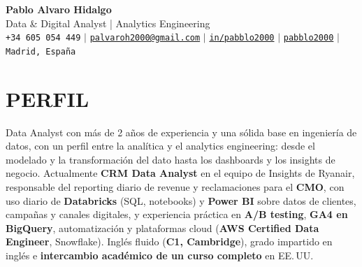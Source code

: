\documentclass[a4paper,11pt]{article}
\begin{document}
\begin{center}
    \textbf{\Huge Pablo Alvaro Hidalgo} \\ \vspace{3pt}
    \large Data \& Digital Analyst | Analytics Engineering \\ \vspace{4pt}
    \small
    \faPhone* \hspace{1pt}\texttt{+34 605 054 449} \hspace{2pt} $|$ \hspace{2pt}
    \faEnvelope \hspace{1pt}\href{mailto:palvaroh2000@gmail.com}{\texttt{palvaroh2000@gmail.com}} \hspace{2pt} $|$ \hspace{2pt}
    \faLinkedin \hspace{1pt}\href{https://www.linkedin.com/in/pabblo2000/}{\texttt{in/pabblo2000}} \hspace{2pt} $|$ \hspace{2pt}
    \faGithub \hspace{1pt}\href{https://github.com/pabblo2000}{\texttt{pabblo2000}} \hspace{2pt} $|$ \hspace{2pt}
    \faMapMarker* \hspace{1pt}\texttt{Madrid, España}
\end{center}
\vspace{-8pt}

\section{PERFIL}
\small{
Data Analyst con más de 2 años de experiencia y una sólida base en ingeniería de datos, con un perfil entre la analítica y el analytics engineering: desde el modelado y la transformación del dato hasta los dashboards y los insights de negocio.
Actualmente \textbf{CRM Data Analyst} en el equipo de Insights de Ryanair, responsable del reporting diario de revenue y reclamaciones para el \textbf{CMO}, con uso diario de \textbf{Databricks} (SQL, notebooks) y \textbf{Power BI} sobre datos de clientes, campañas y canales digitales, y experiencia práctica en \textbf{A/B testing}, \textbf{GA4 en BigQuery}, automatización y plataformas cloud (\textbf{AWS Certified Data Engineer}, Snowflake).
Inglés fluido (\textbf{C1, Cambridge}), grado impartido en inglés e \textbf{intercambio académico de un curso completo} en EE.\,UU.
}
\vspace{-4pt}
\end{document}
